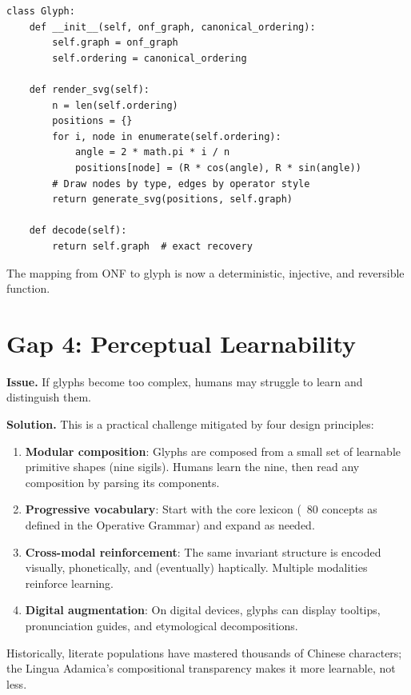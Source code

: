 \documentclass[12pt, letterpaper]{book}
\begin{document}
\begin{lstlisting}
class Glyph:
    def __init__(self, onf_graph, canonical_ordering):
        self.graph = onf_graph
        self.ordering = canonical_ordering

    def render_svg(self):
        n = len(self.ordering)
        positions = {}
        for i, node in enumerate(self.ordering):
            angle = 2 * math.pi * i / n
            positions[node] = (R * cos(angle), R * sin(angle))
        # Draw nodes by type, edges by operator style
        return generate_svg(positions, self.graph)

    def decode(self):
        return self.graph  # exact recovery
\end{lstlisting}

The mapping from ONF to glyph is now a deterministic, injective, and reversible function.

\section{Gap 4: Perceptual Learnability}

\textbf{Issue.} If glyphs become too complex, humans may struggle to learn and distinguish them.

\textbf{Solution.} This is a practical challenge mitigated by four design principles:

\begin{enumerate}[label=(\roman*)]
    \item \textbf{Modular composition}: Glyphs are composed from a small set of learnable primitive shapes (nine sigils). Humans learn the nine, then read any composition by parsing its components.
    \item \textbf{Progressive vocabulary}: Start with the core lexicon (~80 concepts as defined in the Operative Grammar) and expand as needed.
    \item \textbf{Cross-modal reinforcement}: The same invariant structure is encoded visually, phonetically, and (eventually) haptically. Multiple modalities reinforce learning.
    \item \textbf{Digital augmentation}: On digital devices, glyphs can display tooltips, pronunciation guides, and etymological decompositions.
\end{enumerate}

Historically, literate populations have mastered thousands of Chinese characters; the Lingua Adamica's compositional transparency makes it more learnable, not less.
\end{document}
